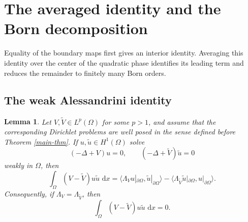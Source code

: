 \documentclass[a4paper,11pt]{article}
\newcommand{\dd}{\,\text{d}}
\theoremstyle{plain}
\newtheorem{lem}[thm]{Lemma}
\theoremstyle{definition}
\theoremstyle{remark}
\begin{document}
\section{The averaged identity and the Born decomposition}\label{sec:averaged-identity}\label{sec:reduction-cancellation}

Equality of the boundary maps first gives an interior identity.  Averaging this identity over the center of the quadratic phase identifies its leading term and reduces the remainder to finitely many Born orders.

\subsection{The weak Alessandrini identity}

\begin{lem}\label{lem-alessandrini}
Let $V,\widetilde V\in L^p(\Omega)$ for some $p>1$, and assume that the corresponding Dirichlet problems are well posed in the sense defined before Theorem \ref{main-thm}.  If $u,\widetilde u\in H^1(\Omega)$ solve
\begin{equation}
        (-\Delta+V)u=0,
        \qquad
        (-\Delta+\widetilde V)\widetilde u=0
\end{equation}
weakly in $\Omega$, then
\begin{equation}\label{weak-alessandrini}
        \int_\Omega (V-\widetilde V)u\widetilde u\,\dd x
        =\langle \Lambda_V u|_{\partial\Omega},\widetilde u|_{\partial\Omega}\rangle
        -\langle \Lambda_{\widetilde V}\widetilde u|_{\partial\Omega},u|_{\partial\Omega}\rangle .
\end{equation}
Consequently, if $\Lambda_V=\Lambda_{\widetilde V}$, then
\begin{equation}\label{weak-alessandrini-zero}
        \int_\Omega (V-\widetilde V)u\widetilde u\,\dd x=0.
\end{equation}
\end{lem}
\end{document}
